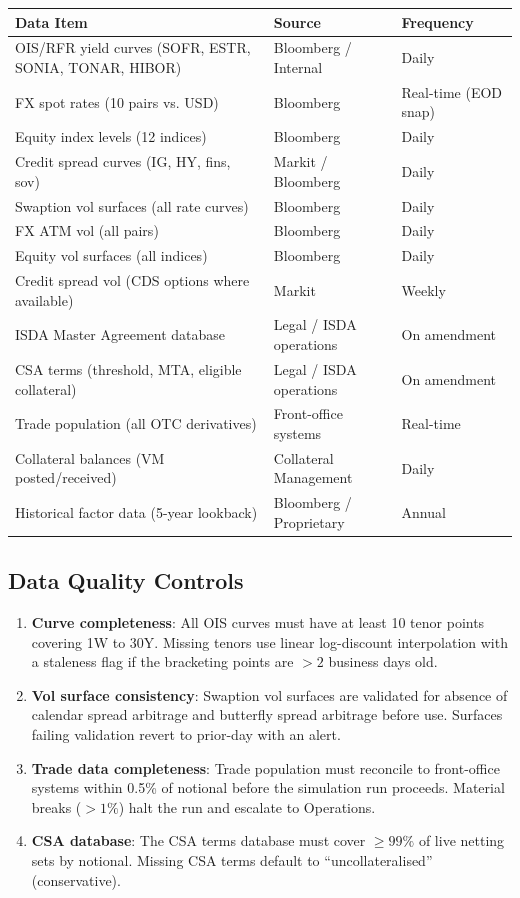 \documentclass[11pt,a4paper]{article}
\begin{document}
\begin{longtable}{@{}lll@{}}
\toprule
\textbf{Data Item} & \textbf{Source} & \textbf{Frequency} \\
\midrule
\endhead
\bottomrule
\endfoot
OIS/RFR yield curves (SOFR, ESTR, SONIA, TONAR, HIBOR) & Bloomberg / Internal & Daily \\
FX spot rates (10 pairs vs. USD) & Bloomberg & Real-time (EOD snap) \\
Equity index levels (12 indices) & Bloomberg & Daily \\
Credit spread curves (IG, HY, fins, sov) & Markit / Bloomberg & Daily \\
Swaption vol surfaces (all rate curves) & Bloomberg & Daily \\
FX ATM vol (all pairs) & Bloomberg & Daily \\
Equity vol surfaces (all indices) & Bloomberg & Daily \\
Credit spread vol (CDS options where available) & Markit & Weekly \\
ISDA Master Agreement database & Legal / ISDA operations & On amendment \\
CSA terms (threshold, MTA, eligible collateral) & Legal / ISDA operations & On amendment \\
Trade population (all OTC derivatives) & Front-office systems & Real-time \\
Collateral balances (VM posted/received) & Collateral Management & Daily \\
Historical factor data (5-year lookback) & Bloomberg / Proprietary & Annual \\
\end{longtable}

\subsection{Data Quality Controls}

\begin{enumerate}[noitemsep]
  \item \textbf{Curve completeness}: All OIS curves must have at least 10 tenor
        points covering 1W to 30Y. Missing tenors use linear log-discount
        interpolation with a staleness flag if the bracketing points are
        $>2$ business days old.
  \item \textbf{Vol surface consistency}: Swaption vol surfaces are validated
        for absence of calendar spread arbitrage and butterfly spread arbitrage
        before use. Surfaces failing validation revert to prior-day with an
        alert.
  \item \textbf{Trade data completeness}: Trade population must reconcile to
        front-office systems within 0.5\% of notional before the simulation
        run proceeds. Material breaks ($>1\%$) halt the run and escalate to
        Operations.
  \item \textbf{CSA database}: The CSA terms database must cover $\geq 99\%$
        of live netting sets by notional. Missing CSA terms default to
        ``uncollateralised'' (conservative).
\end{enumerate}
\end{document}
